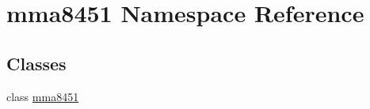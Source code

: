 \hypertarget{namespacemma8451}{}\section{mma8451 Namespace Reference}
\label{namespacemma8451}
\subsection*{Classes}
\begin{DoxyCompactItemize}
\item 
class \hyperlink{classmma8451_1_1mma8451}{mma8451}
\end{DoxyCompactItemize}

